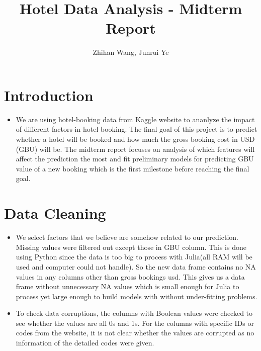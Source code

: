 \documentclass{article}
\title{Hotel Data Analysis - Midterm Report}
\author{Zhihan Wang, Junrui Ye}
\date{}
\begin{document}
\maketitle

\section{Introduction}
\begin{itemize}
    \item We are using hotel-booking data from Kaggle website to ananlyze the impact of different factors in hotel booking. The final goal of this project is to predict whether a hotel will be booked and how much the gross booking cost in USD (GBU) will be. 
The midterm report focuses on analysis of which features will affect the prediction the most and fit preliminary models for predicting GBU value of a new booking which is the first milestone before reaching the final goal.
\end{itemize} 

\section{Data Cleaning}
\begin{itemize}
    \item We select factors that we believe are somehow related to our prediction. Missing values were filtered out except those in GBU column. This is done using Python since the data is too big to process with Julia(all RAM will be used and computer could not handle). So the new data frame contains no NA values in any columns other than gross bookings usd. This gives us a data frame without unnecessary NA values which is small enough for Julia to process yet large enough to build models with without under-fitting problems. 
    \item To check data corruptions, the columns with Boolean values were checked to see whether the values are all 0s and 1s. For the columns with specific IDs or codes from the website, it is not clear whether the values are corrupted as no information of the detailed codes were given.
\end{itemize}
\end{document}
